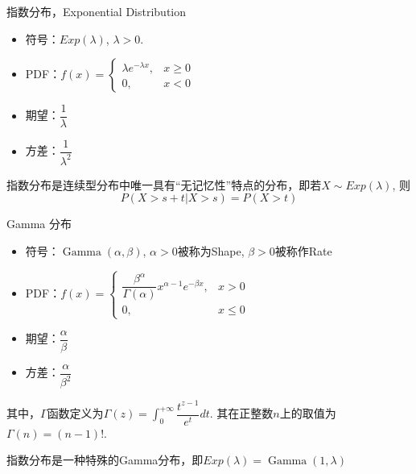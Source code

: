 
\begin{frame}

\begin{block}{指数分布，Exponential Distribution}
\begin{itemize}
\item 符号：$Exp(\lambda)$, \; $\lambda > 0$.
\item PDF：$f(x) =
\begin{cases}
\lambda e^{-\lambda x}, & x \ge 0 \\
0, & x < 0
\end{cases}$
\item 期望：$\dfrac{1}{\lambda}$
\item 方差：$\dfrac{1}{\lambda^2}$
\end{itemize}

\vspace{1em}
\pause

指数分布是连续型分布中唯一具有``无记忆性''特点的分布，即若$X\sim Exp(\lambda)$, 则
\[P(X>s+t | X>s) = P(X>t)\]
\end{block}

\end{frame}


\begin{frame}

\begin{block}{Gamma 分布}
\begin{itemize}
\item 符号：$\operatorname{Gamma}(\alpha,\beta)$, $\alpha > 0$被称为Shape, $\beta > 0$被称作Rate
\item PDF：$f(x) = \begin{cases}
\dfrac{\beta^{\alpha}}{\Gamma(\alpha)} x^{\alpha-1} e^{-\beta x}, & x > 0 \\
0, & x \le 0
\end{cases}$
\item 期望：$\dfrac{\alpha}{\beta}$
\item 方差：$\dfrac{\alpha}{\beta^2}$
\end{itemize}
\end{block}

其中，$\Gamma$函数定义为$\displaystyle \Gamma(z) = \int_0^{+\infty} \dfrac{t^{z-1}}{e^t} dt$. 其在正整数$n$上的取值为$\Gamma(n) = (n-1)!$.

\vspace{1em}
\pause

指数分布是一种特殊的Gamma分布，即$Exp(\lambda) = \operatorname{Gamma}(1, \lambda)$

\end{frame}


